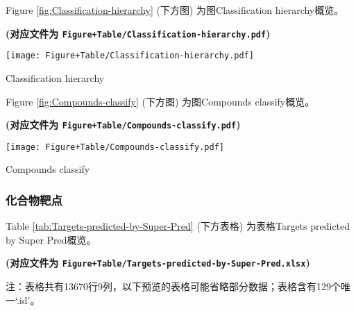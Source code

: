 \documentclass[
]{article}
\begin{document}
Figure \ref{fig:Classification-hierarchy} (下方图) 为图Classification hierarchy概览。

\textbf{(对应文件为 \texttt{Figure+Table/Classification-hierarchy.pdf})}

\def\@captype{figure}
\begin{center}
\texttt{[image: Figure+Table/Classification-hierarchy.pdf]}
\caption{Classification hierarchy}\label{fig:Classification-hierarchy}
\end{center}

Figure \ref{fig:Compounds-classify} (下方图) 为图Compounds classify概览。

\textbf{(对应文件为 \texttt{Figure+Table/Compounds-classify.pdf})}

\def\@captype{figure}
\begin{center}
\texttt{[image: Figure+Table/Compounds-classify.pdf]}
\caption{Compounds classify}\label{fig:Compounds-classify}
\end{center}

\hypertarget{ux5316ux5408ux7269ux9776ux70b9}{%
\subsubsection{化合物靶点}\label{ux5316ux5408ux7269ux9776ux70b9}}

Table \ref{tab:Targets-predicted-by-Super-Pred} (下方表格) 为表格Targets predicted by Super Pred概览。

\textbf{(对应文件为 \texttt{Figure+Table/Targets-predicted-by-Super-Pred.xlsx})}

\begin{center}\begin{tcolorbox}[colback=gray!10, colframe=gray!50, width=0.9\linewidth, arc=1mm, boxrule=0.5pt]注：表格共有13670行9列，以下预览的表格可能省略部分数据；表格含有129个唯一`.id'。
\end{tcolorbox}
\end{center}
\end{document}
